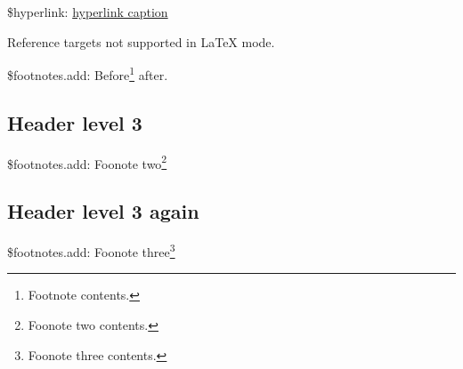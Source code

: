\documentclass[ebook,demo]{pyscribe}
\begin{document}
\par\$hyperlink: \href{https://example.org}{hyperlink caption}

Reference targets not supported in LaTeX mode.

\par\$footnotes.add: Before\footnote{Footnote contents.} after.

\subsection{Header level 3}
\par\$footnotes.add: Foonote two\footnote{Foonote two contents.}

\subsection{Header level 3 again}
\par\$footnotes.add: Foonote three\footnote{Foonote three contents.}
\end{document}
